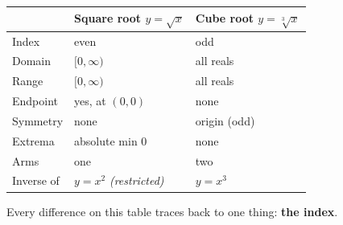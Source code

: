 \documentclass[aspectratio=169, 11pt]{beamer}
\begin{document}
\begin{frame}[t, plain]
  \begin{center}
  \renewcommand{\arraystretch}{1.35}
  \begin{tabular}{lll}
  \hline
   & \textbf{Square root} $y=\sqrt{x}$ & \textbf{Cube root} $y=\sqrt[3]{x}$ \\
  \hline
  Index & even & odd \\
  Domain & $[0,\infty)$ & all reals \\
  Range & $[0,\infty)$ & all reals \\
  Endpoint & yes, at $(0,0)$ & none \\
  Symmetry & none & origin (odd) \\
  Extrema & absolute min $0$ & none \\
  Arms & one & two \\
  Inverse of & $y=x^2$ \emph{(restricted)} & $y=x^3$ \\
  \hline
  \end{tabular}
  \end{center}
  \vspace{4pt}
  \begin{center}
    Every difference on this table traces back to one thing: \textbf{the index}.
  \end{center}
\end{frame}
\end{document}
